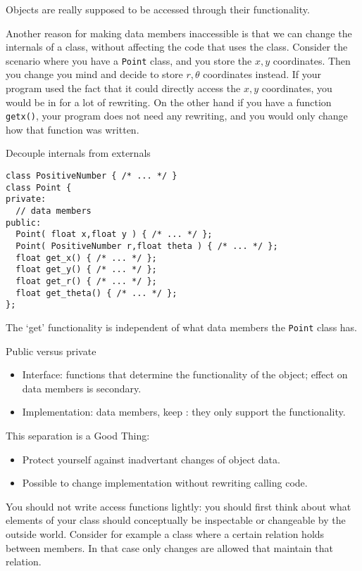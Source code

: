 Objects are really supposed to be accessed through their
functionality.

Another reason for making data members inaccessible is that we can
change the internals of a class, without affecting the code that uses
the class. Consider the scenario where you have a \lstinline{Point} class, and
you store the $x,y$ coordinates. Then you change you mind and decide
to store $r,\theta$ coordinates instead. If your program used the fact
that it could directly access the $x,y$ coordinates, you would be in
for a lot of rewriting. On the other hand if you have a function
\lstinline{getx()}, your program does not need any rewriting, and you would
only change how that function was written.

\begin{block}{Decouple internals from externals}
  \label{sl:repr-independent}
\begin{lstlisting}
class PositiveNumber { /* ... */ }
class Point {
private:
  // data members
public:
  Point( float x,float y ) { /* ... */ };
  Point( PositiveNumber r,float theta ) { /* ... */ };
  float get_x() { /* ... */ };
  float get_y() { /* ... */ };
  float get_r() { /* ... */ };
  float get_theta() { /* ... */ };
};
\end{lstlisting}
  The `get' functionality is independent of what data members the
  \lstinline{Point} class has.
\end{block}

\begin{block}{Public versus private}
  \label{sl:interfaceimpl}
  \begin{itemize}
  \item Interface:  functions that determine the
    functionality of the object; effect on data members is secondary.
  \item Implementation: data members, keep : they
    only support the functionality.
  \end{itemize}
  This separation is a Good Thing:
  \begin{itemize}
  \item Protect yourself against inadvertant changes of object data.
  \item Possible to change implementation without rewriting calling code.
  \end{itemize}
\end{block}

You should not write access functions lightly: you should first think
about what elements of your class should conceptually be inspectable
or changeable by the outside world.  Consider for example a class
where a certain relation holds between members. In that case only
changes are allowed that maintain that relation.

